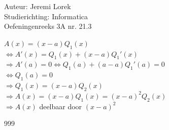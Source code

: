 \documentclass[a4paper]{article}
\begin{document}
  
\noindent \large Auteur: Jeremi Lorek\\
\noindent \large Studierichting: Informatica\\
\noindent \large Oefeningenreeks 3A nr. 21.3\\

\medskip
\normalsize

$A(x) = (x - a) Q_1(x)$  \\

$\Leftrightarrow A'(x) = Q_1(x) + (x - a) Q_1'(x)$  \\

$\Rightarrow A'(a) = 0 \Leftrightarrow Q_1(a) + (a - a) Q_1'(a) = 0$  \\

$\Leftrightarrow Q_1(a) = 0$  \\

$\Rightarrow Q_1(x) = (x - a) Q_2(x)$  \\

$\Rightarrow A(x) = (x - a) Q_1(x) = (x - a)^2 Q_2(x)$  \\

$\Rightarrow A(x)$ deelbaar door $(x - a)^2$  \\

\begin{thebibliography}{999}
\end{thebibliography}
\end{document}
